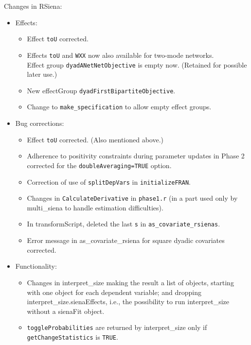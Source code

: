 \documentclass[a4paper,fleqn,11pt]{article}
\newcommand{\+}{\, + \,}
\newcommand{\sfn}[1]{\textsf{#1}}
\begin{document}
\begin{small}
\begin{itemize}
Changes in RSiena:
\begin{itemize}
  \item  Effects:
  \begin{itemize}
  \item Effect \texttt{toU} corrected.
  \item Effects \texttt{toU} and \texttt{WXX} now also available for two-mode networks.\\
    Effect group \texttt{dyadANetNetObjective} is empty now.
    (Retained for possible later use.)
  \item  New effectGroup \texttt{dyadFirstBipartiteObjective}.
  \item Change to \texttt{make\_specification} to allow empty effect groups.
    \end{itemize}
  \item  Bug corrections:
    \begin{itemize}
  \item Effect \texttt{toU} corrected. (Also mentioned above.)
\item  Adherence to positivity constraints during parameter updates in Phase 2
   corrected for the \texttt{doubleAveraging=TRUE} option.
  \item Correction of use of \texttt{splitDepVars} in \texttt{initializeFRAN}.
  \item Changes in \texttt{CalculateDerivative} in \texttt{phase1.r}
    (in a part used only by \sfn{multi\_siena} to handle estimation
    difficulties).
  \item In \sfn{transformScript}, deleted the last \texttt{s} in \texttt{as\_covariate\_rsienas}.
  \item Error message in \sfn{as\_covariate\_rsiena}
    for square dyadic covariates corrected.
    \end{itemize}
    \end{itemize}
\begin{itemize}
   \item Functionality:
   \begin{itemize}
  \item Changes in \sfn{interpret\_size} making the result a list of objects,
    starting with one object for each dependent variable;
    and dropping \sfn{interpret\_size.sienaEffects}, i.e., the possibility
    to run \sfn{interpret\_size} without a \sfn{sienaFit} object.
  \item \texttt{toggleProbabilities} are returned by \sfn{interpret\_size} only if
    \texttt{getChangeStatistics} is \texttt{TRUE}.

\end{itemize}
\end{itemize}
\end{itemize}
\end{small}
\end{document}
